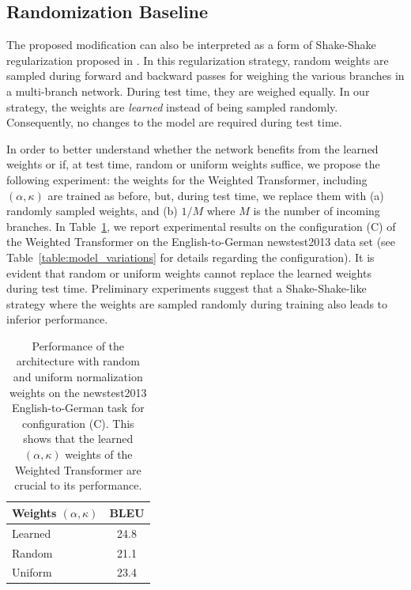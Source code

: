 \documentclass{article} %
\newcommand{\name}{Weighted Transformer\xspace}
\begin{document}
\subsection{Randomization Baseline}
The proposed modification can also be interpreted as a form of Shake-Shake regularization proposed in \cite{gastaldi2017shake}. In this regularization strategy, random weights are sampled during forward and backward passes for weighing the various branches in a multi-branch network. During test time, they are weighed equally. In our strategy, the weights are \textit{learned} instead of being sampled randomly. Consequently, no changes to the model are required during test time.

In order to better understand whether the network benefits from the learned weights or if, at test time, random or uniform weights suffice, we propose the following experiment: the weights for the \name, including $(\alpha,\kappa)$ are trained as before, but, during test time, we replace them with (a) randomly sampled weights, and (b) $1/M$ where $M$ is the number of incoming branches. In Table~\ref{table:normalizationweights}, we report experimental results on the configuration (C) of the \name on the English-to-German newstest2013 data set (see Table~\ref{table:model_variations} for details regarding the configuration). It is evident that random or uniform weights cannot replace the learned weights during test time. Preliminary experiments suggest that a Shake-Shake-like strategy where the weights are sampled randomly during training also leads to inferior performance.

\begin{table}
\center
\begin{tabular}{l|c}
\toprule
\bf Weights $(\alpha,\kappa)$ & \bf BLEU \\
\midrule
Learned & 24.8 \\ 
Random & 21.1 \\ 
Uniform & 23.4 \\ 
\end{tabular}
\caption{
Performance of the architecture with random and uniform normalization weights on the newstest2013 English-to-German task for configuration (C). This shows that the learned $(\alpha,\kappa)$ weights of the \name are crucial to its performance.
}
\label{table:normalizationweights}
\end{table}

\end{document}
